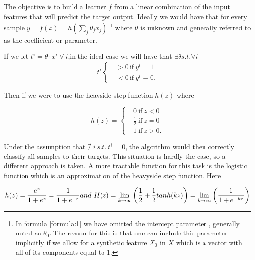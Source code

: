 The objective is to build a learner $f$ from a linear combination of the input features that will predict the target output. Ideally we would have that for every sample $y = f(x) = h\left(\sum_{j}\theta_jx_j\right)$ \label{formula:1} \footnote{In formula \ref{formula:1} we have omitted the intercept parameter , generally noted as $\theta_0$. The reason for this is that one can include this parameter implicitly if we allow for a synthetic feature $X_0$ in $X$ which is a vector with all of its components equal to 1.  } where $\theta$ is unknown and generally referred to as the coefficient or parameter. 

If we let $ t^i = \theta \cdot x^i  \ \forall \ i $,in the ideal case we will have that $\exists \theta s.t. \forall i $ 
\[
    t^i
      \begin{cases}
        &>0 \ \mbox{if} \ y^i=1 \\
        &<0 \ \mbox{if} \ y^i=0.
      \end{cases}
    \]

Then if we were to use the heavside step function $h(z)$  where

\[
    h(z) =
      \begin{cases}
        &0 \ \mbox{if} \ z<0 \\
        &\frac{1}{2} \ \mbox{if} \  z=0 \\
        &1 \ \mbox{if} \  z>0.
      \end{cases}
    \]

Under the assumption that $\nexists\  i \  s.t. \ t^i = 0$, the algorithm would then correctly classify all samples to their targets. This situation is hardly the case, so a different approach is taken. A more tractable function for this task is the logistic function which is an approximation of the heavyside step function. Here  

\begin{equation} \label{eq:logit}
h(z)  = \frac{e^{z}}{1 + e^{z}} = \frac{1}{1 + e^{-z}}  \\
and \  H(z) = \lim_{k \to \infty} \left(\frac{1}{2} + \frac{1}{2}tanh(kz) \right) = \lim_{k \to \infty} \left(\frac{1}{1+e^{-kz}} \right)  
\end{equation}


